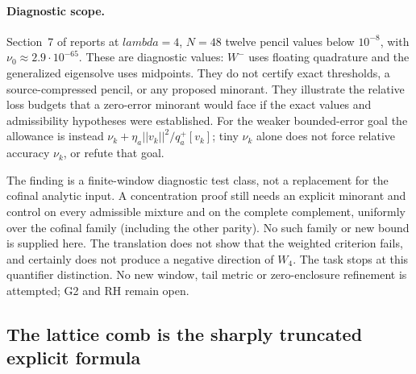 \documentclass[11pt]{article}
\def\lambda{lambda}%
\def\norm#1{||#1||}%
\theoremstyle{remark}
\newcommand{\norm}[1]{\left\lVert #1\right\rVert}
\begin{document}
\paragraph{Diagnostic scope.}
Section~7 of  reports
at $\lambda=4$, $N=48$ twelve pencil values below $10^{-8}$, with
$\nu_0\approx2.9\cdot10^{-65}$. These are diagnostic values:
$W^-$ uses floating quadrature and the generalized eigensolve uses
midpoints. They do not certify exact thresholds, a source-compressed
pencil, or any proposed minorant. They illustrate the relative
loss budgets that a zero-error minorant would face if the exact
values and admissibility hypotheses were established.
For the weaker bounded-error goal the allowance is instead
$\nu_k+\eta_a\norm{v_k}^2/q_a^+[v_k]$; tiny $\nu_k$ alone does not
force relative accuracy $\nu_k$, or refute that goal.

The finding is a finite-window diagnostic test class, not a replacement
for the cofinal analytic input. A concentration proof still needs an
explicit minorant and control on every admissible mixture and on the
complete complement, uniformly over the cofinal family (including the
other parity). No such family or new bound is supplied here. The
translation does not show that the weighted criterion fails, and
certainly does not produce a negative direction of $W_4$. The task
stops at this quantifier distinction. No new window, tail metric or
zero-enclosure refinement is attempted; G2 and RH remain open.

\subsection{The lattice comb is the sharply truncated explicit formula}
\end{document}
